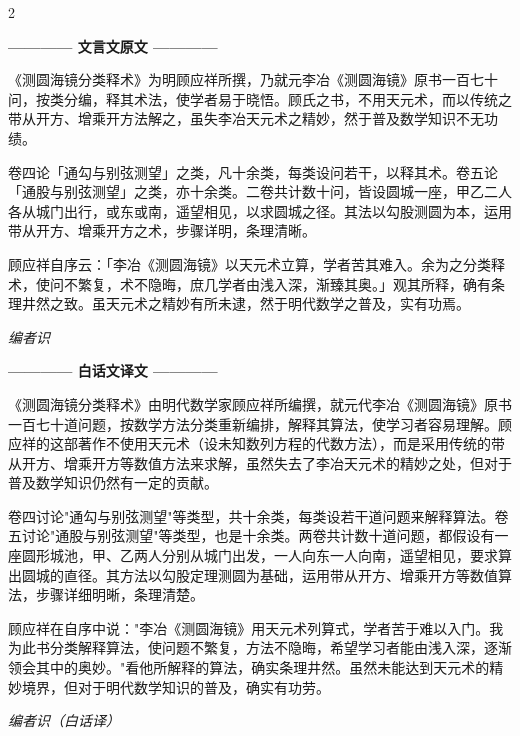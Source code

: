 \documentclass[10pt,a4paper]{article}
\newcommand{\leftheader}{%
  \begin{center}\textcolor{classicalcolor}{\small\textbf{———— 文言文原文 ————}}\end{center}
  \vspace{0.2cm}
}
\newcommand{\rightheader}{%
  \begin{center}\textcolor{moderncolor}{\small\textbf{———— 白话文译文 ————}}\end{center}
  \vspace{0.2cm}
}
\begin{document}
\begin{paracol}{2}

\leftheader

《测圆海镜分类释术》为明顾应祥所撰，乃就元李冶《测圆海镜》原书一百七十问，按类分编，释其术法，使学者易于晓悟。顾氏之书，不用天元术，而以传统之带从开方、增乘开方法解之，虽失李冶天元术之精妙，然于普及数学知识不无功绩。

卷四论「通勾与别弦测望」之类，凡十余类，每类设问若干，以释其术。卷五论「通股与别弦测望」之类，亦十余类。二卷共计数十问，皆设圆城一座，甲乙二人各从城门出行，或东或南，遥望相见，以求圆城之径。其法以勾股测圆为本，运用带从开方、增乘开方之术，步骤详明，条理清晰。

顾应祥自序云：「李冶《测圆海镜》以天元术立算，学者苦其难入。余为之分类释术，使问不繁复，术不隐晦，庶几学者由浅入深，渐臻其奥。」观其所释，确有条理井然之致。虽天元术之精妙有所未逮，然于明代数学之普及，实有功焉。

\vspace{0.5cm}
\begin{flushright}
\textit{编者识}
\end{flushright}

\switchcolumn

\rightheader

《测圆海镜分类释术》由明代数学家顾应祥所编撰，就元代李冶《测圆海镜》原书一百七十道问题，按数学方法分类重新编排，解释其算法，使学习者容易理解。顾应祥的这部著作不使用天元术（设未知数列方程的代数方法），而是采用传统的带从开方、增乘开方等数值方法来求解，虽然失去了李冶天元术的精妙之处，但对于普及数学知识仍然有一定的贡献。

卷四讨论"通勾与别弦测望"等类型，共十余类，每类设若干道问题来解释算法。卷五讨论"通股与别弦测望"等类型，也是十余类。两卷共计数十道问题，都假设有一座圆形城池，甲、乙两人分别从城门出发，一人向东一人向南，遥望相见，要求算出圆城的直径。其方法以勾股定理测圆为基础，运用带从开方、增乘开方等数值算法，步骤详细明晰，条理清楚。

顾应祥在自序中说："李冶《测圆海镜》用天元术列算式，学者苦于难以入门。我为此书分类解释算法，使问题不繁复，方法不隐晦，希望学习者能由浅入深，逐渐领会其中的奥妙。"看他所解释的算法，确实条理井然。虽然未能达到天元术的精妙境界，但对于明代数学知识的普及，确实有功劳。

\vspace{0.5cm}
\begin{flushright}
\textit{编者识（白话译）}
\end{flushright}

\end{paracol}
\end{document}
